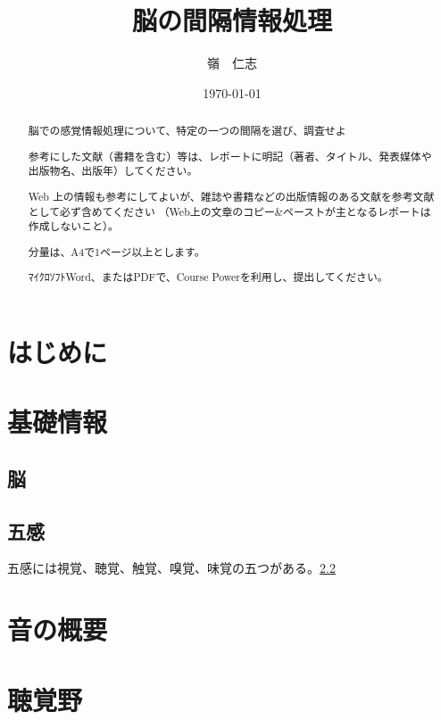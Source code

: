 \documentclass[15pt]{jarticle}
\title{脳の間隔情報処理}
\author{嶺　仁志}
\date{\today}
\begin{document}
\maketitle

\begin{abstract}
脳での感覚情報処理について、特定の一つの間隔を選び、調査せよ

参考にした文献（書籍を含む）等は、レポートに明記（著者、タイトル、発表媒体や出版物名、出版年）してください。

Web 上の情報も参考にしてよいが、雑誌や書籍などの出版情報のある文献を参考文献として必ず含めてください
（Web上の文章のコピー\&ペーストが主となるレポートは作成しないこと）。

分量は、A4で1ページ以上とします。

ﾏｲｸﾛｿﾌﾄWord、またはPDFで、Course Powerを利用し、提出してください。
\end{abstract}


\section{はじめに}
\label{intro}

\section{基礎情報}
\label{basic}
	\subsection{脳}
	\label{brain}
	\subsection{五感}
	\label{five senses}
	五感には視覚、聴覚、触覚、嗅覚、味覚の五つがある。\ref{five senses}
\section{音の概要}

\section{聴覚野}
\cite{聴覚野}



\end{document}
